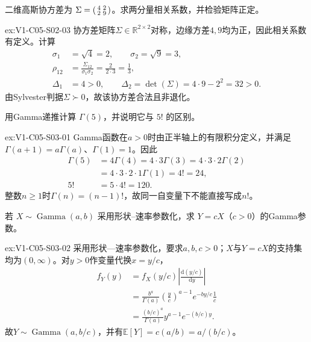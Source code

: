 \begin{SLChapterExercisePairSection}
\begin{exercise}\label{ex:V1-C05-S02-03}
二维高斯协方差为 $\Sigma=\begin{psmallmatrix}4&2\\2&9\end{psmallmatrix}$。求两分量相关系数，并检验矩阵正定。
\end{exercise}
\label{sol:V1-C05-S02-03}
\begin{chapterexercisesolution}{ex:V1-C05-S02-03}
协方差矩阵$\Sigma\in\mathbb R^{2\times2}$对称，边缘方差$4,9$均为正，因此相关系数有定义。计算
\[
\begin{aligned}
\sigma_1&=\sqrt4=2,\qquad \sigma_2=\sqrt9=3,\\
\rho_{12}&=\frac{\Sigma_{12}}{\sigma_1\sigma_2}
=\frac2{2\cdot3}=\frac13,\\
\Delta_1&=4>0,\qquad
\Delta_2=\det(\Sigma)=4\cdot9-2^2=32>0.
\end{aligned}
\]
由Sylvester判据$\Sigma\succ0$，故该协方差合法且非退化。
\end{chapterexercisesolution}

\begin{exercise}\label{ex:V1-C05-S03-01}
用Gamma递推计算 $\Gamma(5)$，并说明它与 $5!$ 的区别。
\end{exercise}
\label{sol:V1-C05-S03-01}
\begin{chapterexercisesolution}{ex:V1-C05-S03-01}
Gamma函数在$a>0$时由正半轴上的有限积分定义，并满足$\Gamma(a+1)=a\Gamma(a)$、$\Gamma(1)=1$。因此
\[
\begin{aligned}
\Gamma(5)
&=4\Gamma(4)=4\cdot3\Gamma(3)
=4\cdot3\cdot2\Gamma(2)\\
&=4\cdot3\cdot2\cdot1\Gamma(1)=4!=24,\\
5!&=5\cdot4!=120.
\end{aligned}
\]
整数$n\ge1$时$\Gamma(n)=(n-1)!$，故同一自变量下不能直接写成$n!$。
\end{chapterexercisesolution}

\begin{exercise}\label{ex:V1-C05-S03-02}
若 $X\sim\operatorname{Gamma}(a,b)$ 采用形状--速率参数化，求 $Y=cX$（$c>0$）的Gamma参数。
\end{exercise}
\label{sol:V1-C05-S03-02}
\begin{chapterexercisesolution}{ex:V1-C05-S03-02}
采用形状—速率参数化，要求$a,b,c>0$；$X$与$Y=cX$的支持集均为$(0,\infty)$。对$y>0$作变量代换$x=y/c$，
\[
\begin{aligned}
f_Y(y)
&=f_X(y/c)\left|\frac{\mathrm d(y/c)}{\mathrm dy}\right|\\
&=\frac{b^a}{\Gamma(a)}\left(\frac yc\right)^{a-1}
e^{-by/c}\frac1c\\
&=\frac{(b/c)^a}{\Gamma(a)}y^{a-1}e^{-(b/c)y}.
\end{aligned}
\]
故$Y\sim\operatorname{Gamma}(a,b/c)$，并有$\mathbb E[Y]=c(a/b)=a/(b/c)$。
\end{chapterexercisesolution}


\end{SLChapterExercisePairSection}
